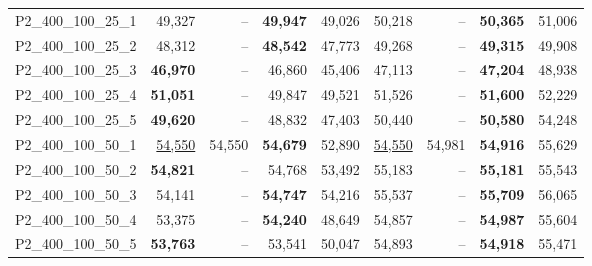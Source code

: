 \documentclass[ppgc,tese,english,formais,babel]{iiufrgs}
\begin{document}
\begin{table}[ht]
{\begin{tabular}{lrrrrrrrr}
P2\_400\_100\_25\_1 & 49,327 & -- & \textbf{49,947} & 49,026 & 50,218 & -- & \textbf{50,365} & 51,006 \\
P2\_400\_100\_25\_2 & 48,312 & -- & \textbf{48,542} & 47,773 & 49,268 & -- & \textbf{49,315} & 49,908 \\
P2\_400\_100\_25\_3 & \textbf{46,970} & -- & 46,860 & 45,406 & 47,113 & -- & \textbf{47,204} & 48,938 \\
P2\_400\_100\_25\_4 & \textbf{51,051} & -- & 49,847 & 49,521 & 51,526 & -- & \textbf{51,600} & 52,229 \\
P2\_400\_100\_25\_5 & \textbf{49,620} & -- & 48,832 & 47,403 & 50,440 & -- & \textbf{50,580} & 54,248 \\
P2\_400\_100\_50\_1 & \underline{54,550} & 54,550 & \textbf{54,679} & 52,890 & \underline{54,550} & 54,981 & \textbf{54,916} & 55,629 \\
P2\_400\_100\_50\_2 & \textbf{54,821} & -- & 54,768 & 53,492 & 55,183 & -- & \textbf{55,181} & 55,543 \\
P2\_400\_100\_50\_3 & 54,141 & -- & \textbf{54,747} & 54,216 & 55,537 & -- & \textbf{55,709} & 56,065 \\
P2\_400\_100\_50\_4 & 53,375 & -- & \textbf{54,240} & 48,649 & 54,857 & -- & \textbf{54,987} & 55,604 \\
P2\_400\_100\_50\_5 & \textbf{53,763} & -- & 53,541 & 50,047 & 54,893 & -- & \textbf{54,918} & 55,471 \\\hline\hline
\end{tabular}
} %
\label{tab:velasco_new_results_II}
\end{table}
\end{document}
